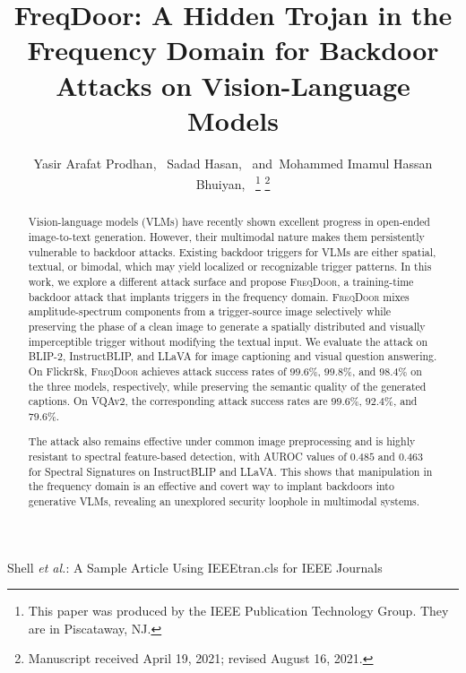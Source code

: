 \documentclass[lettersize,journal]{IEEEtran}
\begin{document}
\title{FreqDoor: A Hidden Trojan in the Frequency Domain for Backdoor Attacks on Vision-Language Models}

\author{Yasir Arafat Prodhan,~
        Sadad Hasan,~
        and~Mohammed Imamul Hassan Bhuiyan,~
\thanks{This paper was produced by the IEEE Publication Technology Group. They are in Piscataway, NJ.}%
\thanks{Manuscript received April 19, 2021; revised August 16, 2021.}}

%
{Shell \MakeLowercase{\textit{et al.}}: A Sample Article Using IEEEtran.cls for IEEE Journals}


\maketitle

\begin{abstract}
Vision-language models (VLMs) have recently shown excellent progress in open-ended image-to-text generation. However, their multimodal nature makes them persistently vulnerable to backdoor attacks. Existing backdoor triggers for VLMs are either spatial, textual, or bimodal, which may yield localized or recognizable trigger patterns. In this work, we explore a different attack surface and propose \textsc {FreqDoor}, a training-time backdoor attack that implants triggers in the frequency domain. \textsc{FreqDoor} mixes amplitude-spectrum components from a trigger-source image selectively while preserving the phase of a clean image to generate a spatially distributed and visually imperceptible trigger without modifying the textual input. We evaluate the attack on BLIP-2, InstructBLIP, and LLaVA for image captioning and visual question answering. On Flickr8k, \textsc{FreqDoor} achieves attack success rates of $99.6\%$, $99.8\%$, and $98.4\%$ on the three models, respectively, while preserving the semantic quality of the generated captions. On VQAv2, the corresponding attack success rates are $99.6\%$, $92.4\%$, and $79.6\%$.

The attack also remains effective under common image preprocessing and is highly resistant to spectral feature-based detection, with AUROC values of $0.485$ and $0.463$ for Spectral Signatures on InstructBLIP and LLaVA. This shows that manipulation in the frequency domain is an effective and covert way to implant backdoors into generative VLMs, revealing an unexplored security loophole in multimodal systems.
\end{abstract}
\end{document}
